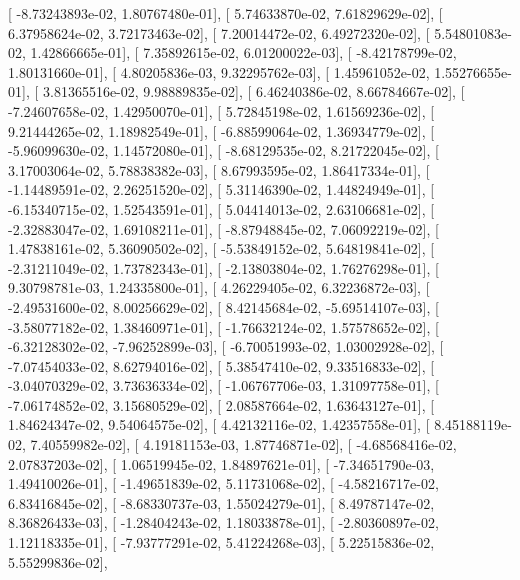 \documentclass{article}
\begin{document}
       [ -8.73243893e-02,   1.80767480e-01],
       [  5.74633870e-02,   7.61829629e-02],
       [  6.37958624e-02,   3.72173463e-02],
       [  7.20014472e-02,   6.49272320e-02],
       [  5.54801083e-02,   1.42866665e-01],
       [  7.35892615e-02,   6.01200022e-03],
       [ -8.42178799e-02,   1.80131660e-01],
       [  4.80205836e-03,   9.32295762e-03],
       [  1.45961052e-02,   1.55276655e-01],
       [  3.81365516e-02,   9.98889835e-02],
       [  6.46240386e-02,   8.66784667e-02],
       [ -7.24607658e-02,   1.42950070e-01],
       [  5.72845198e-02,   1.61569236e-02],
       [  9.21444265e-02,   1.18982549e-01],
       [ -6.88599064e-02,   1.36934779e-02],
       [ -5.96099630e-02,   1.14572080e-01],
       [ -8.68129535e-02,   8.21722045e-02],
       [  3.17003064e-02,   5.78838382e-03],
       [  8.67993595e-02,   1.86417334e-01],
       [ -1.14489591e-02,   2.26251520e-02],
       [  5.31146390e-02,   1.44824949e-01],
       [ -6.15340715e-02,   1.52543591e-01],
       [  5.04414013e-02,   2.63106681e-02],
       [ -2.32883047e-02,   1.69108211e-01],
       [ -8.87948845e-02,   7.06092219e-02],
       [  1.47838161e-02,   5.36090502e-02],
       [ -5.53849152e-02,   5.64819841e-02],
       [ -2.31211049e-02,   1.73782343e-01],
       [ -2.13803804e-02,   1.76276298e-01],
       [  9.30798781e-03,   1.24335800e-01],
       [  4.26229405e-02,   6.32236872e-03],
       [ -2.49531600e-02,   8.00256629e-02],
       [  8.42145684e-02,  -5.69514107e-03],
       [ -3.58077182e-02,   1.38460971e-01],
       [ -1.76632124e-02,   1.57578652e-02],
       [ -6.32128302e-02,  -7.96252899e-03],
       [ -6.70051993e-02,   1.03002928e-02],
       [ -7.07454033e-02,   8.62794016e-02],
       [  5.38547410e-02,   9.33516833e-02],
       [ -3.04070329e-02,   3.73636334e-02],
       [ -1.06767706e-03,   1.31097758e-01],
       [ -7.06174852e-02,   3.15680529e-02],
       [  2.08587664e-02,   1.63643127e-01],
       [  1.84624347e-02,   9.54064575e-02],
       [  4.42132116e-02,   1.42357558e-01],
       [  8.45188119e-02,   7.40559982e-02],
       [  4.19181153e-03,   1.87746871e-02],
       [ -4.68568416e-02,   2.07837203e-02],
       [  1.06519945e-02,   1.84897621e-01],
       [ -7.34651790e-03,   1.49410026e-01],
       [ -1.49651839e-02,   5.11731068e-02],
       [ -4.58216717e-02,   6.83416845e-02],
       [ -8.68330737e-03,   1.55024279e-01],
       [  8.49787147e-02,   8.36826433e-03],
       [ -1.28404243e-02,   1.18033878e-01],
       [ -2.80360897e-02,   1.12118335e-01],
       [ -7.93777291e-02,   5.41224268e-03],
       [  5.22515836e-02,   5.55299836e-02],
\end{document}
